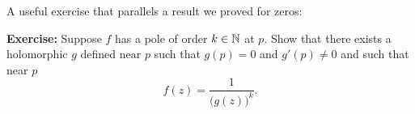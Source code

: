 \documentclass[10pt,aspectratio=169]{beamer}
\begin{document}
\begin{frame}

A useful exercise that parallels a result we proved for zeros:

\medskip
\pause

\textbf{Exercise:}
Suppose $f$ has a pole of order $k \in {\mathbb{N}}$ at $p$.
Show that there exists a holomorphic $g$ defined near $p$
such that $g(p) = 0$ and $g'(p) \not= 0$ and such that near $p$
\begin{equation*}
f(z) = \frac{1}{{\bigl(g(z)\bigr)}^k} .
\end{equation*}

\end{frame}
\end{document}
